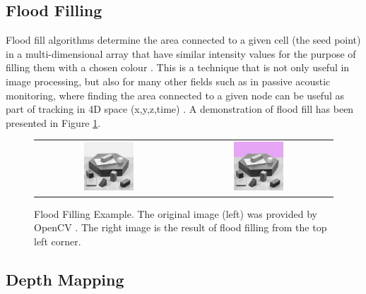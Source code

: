 \subsection{Flood Filling}

Flood fill algorithms determine the area connected to a given cell (the seed point) in a multi-dimensional array that have similar intensity values for the purpose of filling them with a chosen colour \cite{FloodFill}. This is a technique that is not only useful in image processing, but also for many other fields such as in passive acoustic monitoring, where finding the area connected to a given node can be useful as part of tracking in 4D space (x,y,z,time) \cite{nosal2008flood}. A demonstration of flood fill has been presented in Figure \ref{fig:EgFloodFill}.

\begin{figure}[H]
    \begin{center}
    \begin{tabular}{ c c }
        \includegraphics[width=0.35\textwidth]{Figures/blox.jpg} &
        \includegraphics[width=0.35\textwidth]{Figures/bloxFilled.jpg}
    \end{tabular}
    \caption[Flood Filling Example]{Flood Filling Example. The original image (left) was provided by OpenCV \cite{OpenCV}. The right image is the result of flood filling from the top left corner.}
    \label{fig:EgFloodFill}
    \end{center}
\end{figure}

\subsection{Depth Mapping}
\label{subsection:depth}

